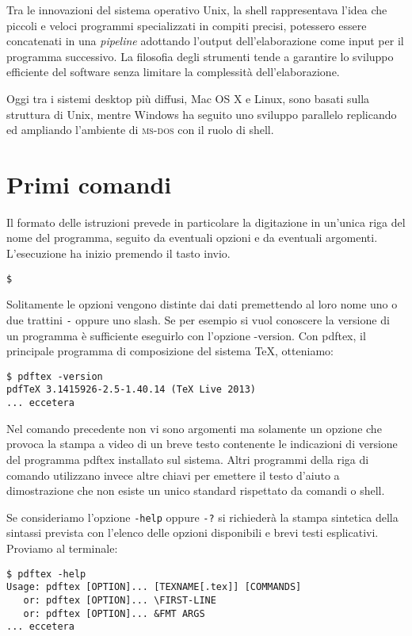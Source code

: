 Tra le innovazioni del sistema operativo Unix, la shell rappresentava l'idea che
piccoli e veloci programmi specializzati in compiti precisi, potessero essere
concatenati in una \emph{pipeline} adottando l'output dell'elaborazione come
input per il programma successivo. La filosofia degli strumenti tende a
garantire lo sviluppo efficiente del software senza limitare la complessità
dell'elaborazione.

Oggi tra i sistemi desktop più diffusi, Mac OS X e Linux, sono basati sulla
struttura di Unix, mentre Windows ha seguito uno sviluppo parallelo replicando
ed ampliando l'ambiente di \textsc{ms-dos} con il ruolo di shell.



\section{Primi comandi}

Il formato delle istruzioni prevede in particolare la digitazione in un'unica
riga del nome del programma, seguito da eventuali opzioni e da eventuali
argomenti. L'esecuzione ha inizio premendo il tasto invio.
\medskip

\texttt{\$   }
\medskip

Solitamente le opzioni vengono distinte dai dati premettendo al loro nome uno o
due trattini \texttt{-} oppure uno slash. Se per esempio si vuol conoscere la
versione di un programma è sufficiente eseguirlo con l'opzione
\textsf{-version}. Con \textsf{pdftex}, il principale programma di composizione
del sistema \TeX{}, otteniamo:
\begin{verbatim}
$ pdftex -version
pdfTeX 3.1415926-2.5-1.40.14 (TeX Live 2013)
... eccetera
\end{verbatim}

Nel comando precedente non vi sono argomenti ma solamente un opzione che provoca
la stampa a video di un breve testo contenente le indicazioni di versione del
programma \textsf{pdftex} installato sul sistema. Altri programmi della riga di
comando utilizzano invece altre chiavi per emettere il testo d'aiuto a
dimostrazione che non esiste un unico standard rispettato da comandi o shell.

Se consideriamo l'opzione \texttt{-help} oppure \texttt{-?} si richiederà la
stampa sintetica della sintassi prevista con l'elenco delle opzioni disponibili
e brevi testi esplicativi. Proviamo al terminale:
\begin{verbatim}
$ pdftex -help
Usage: pdftex [OPTION]... [TEXNAME[.tex]] [COMMANDS]
   or: pdftex [OPTION]... \FIRST-LINE
   or: pdftex [OPTION]... &FMT ARGS
... eccetera
\end{verbatim}

